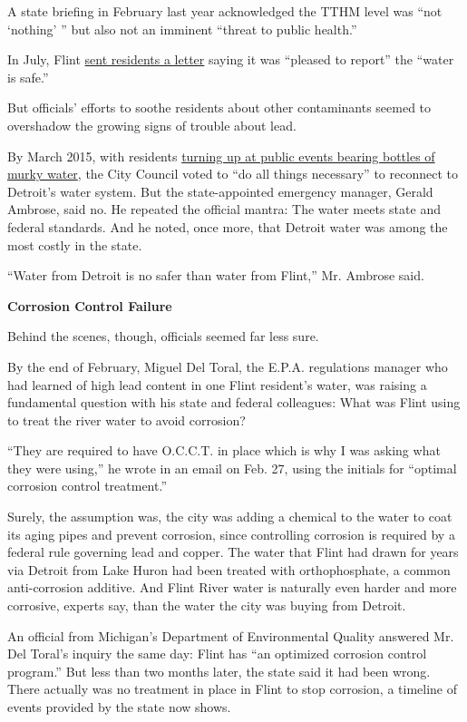 A state briefing in February last year acknowledged the TTHM level was
``not `nothing' '' but also not an imminent ``threat to public health.''

In July, Flint
\href{https://www.cityofflint.com/wp-content/uploads/July-2015-Letter-to-Water-Customers.pdf}{sent
residents a letter} saying it was ``pleased to report'' the ``water is
safe.''

But officials' efforts to soothe residents about other contaminants
seemed to overshadow the growing signs of trouble about lead.

By March 2015, with residents
\href{http://www.nytimes.com/2015/03/25/us/a-water-dilemma-in-michigan-cheaper-or-clearer.html}{turning
up at public events bearing bottles of murky water}, the City Council
voted to ``do all things necessary'' to reconnect to Detroit's water
system. But the state-appointed emergency manager, Gerald Ambrose, said
no. He repeated the official mantra: The water meets state and federal
standards. And he noted, once more, that Detroit water was among the
most costly in the state.

``Water from Detroit is no safer than water from Flint,'' Mr. Ambrose
said.

\textbf{Corrosion Control Failure}

Behind the scenes, though, officials seemed far less sure.

By the end of February, Miguel Del Toral, the E.P.A. regulations manager
who had learned of high lead content in one Flint resident's water, was
raising a fundamental question with his state and federal colleagues:
What was Flint using to treat the river water to avoid corrosion?

``They are required to have O.C.C.T. in place which is why I was asking
what they were using,'' he wrote in an email on Feb. 27, using the
initials for ``optimal corrosion control treatment.''

Surely, the assumption was, the city was adding a chemical to the water
to coat its aging pipes and prevent corrosion, since controlling
corrosion is required by a federal rule governing lead and copper. The
water that Flint had drawn for years via Detroit from Lake Huron had
been treated with orthophosphate, a common anti-corrosion additive. And
Flint River water is naturally even harder and more corrosive, experts
say, than the water the city was buying from Detroit.

An official from Michigan's Department of Environmental Quality answered
Mr. Del Toral's inquiry the same day: Flint has ``an optimized corrosion
control program.'' But less than two months later, the state said it had
been wrong. There actually was no treatment in place in Flint to stop
corrosion, a timeline of events provided by the state now shows.

